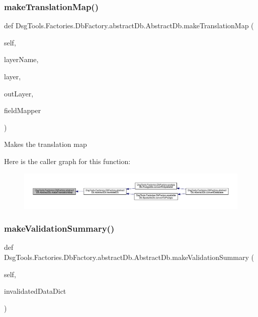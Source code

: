 \subsubsection{\texorpdfstring{make\+Translation\+Map()}{makeTranslationMap()}}
{\footnotesize\ttfamily def Dsg\+Tools.\+Factories.\+Db\+Factory.\+abstract\+Db.\+Abstract\+Db.\+make\+Translation\+Map (\begin{DoxyParamCaption}\item[{}]{self,  }\item[{}]{layer\+Name,  }\item[{}]{layer,  }\item[{}]{out\+Layer,  }\item[{}]{field\+Mapper }\end{DoxyParamCaption})}

\begin{DoxyVerb}Makes the translation map
\end{DoxyVerb}
 Here is the caller graph for this function\+:
\nopagebreak
\begin{figure}[H]
\begin{center}
\leavevmode
\includegraphics[width=350pt]{class_dsg_tools_1_1_factories_1_1_db_factory_1_1abstract_db_1_1_abstract_db_a617875c72a962ca88ff79b8238f9a623_icgraph}
\end{center}
\end{figure}
\mbox{\label{class_dsg_tools_1_1_factories_1_1_db_factory_1_1abstract_db_1_1_abstract_db_ab71a9b09b67acdec2d5e4152c6d61110}} 
\subsubsection{\texorpdfstring{make\+Validation\+Summary()}{makeValidationSummary()}}
{\footnotesize\ttfamily def Dsg\+Tools.\+Factories.\+Db\+Factory.\+abstract\+Db.\+Abstract\+Db.\+make\+Validation\+Summary (\begin{DoxyParamCaption}\item[{}]{self,  }\item[{}]{invalidated\+Data\+Dict }\end{DoxyParamCaption})}

